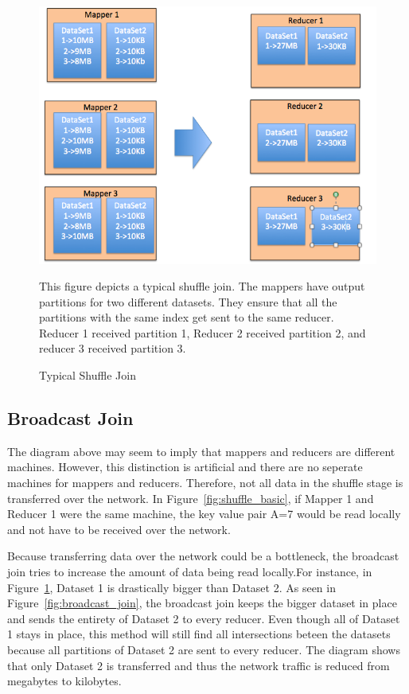 \begin{figure}[h]
\begin{center}
\includegraphics[scale=0.6]{./img/shuffle_join.png}
\caption{Typical Shuffle Join}
\label{fig:shuffle_join}
\end{center}
This figure depicts a typical shuffle join. The mappers have output partitions for two different datasets.
They ensure that all the partitions with the same index get sent to the same reducer. Reducer 1 received partition 1,
Reducer 2 received partition 2, and reducer 3 received partition 3.
\end{figure}

\subsection {Broadcast Join}
The diagram above  may seem to imply that mappers and reducers
are different machines. However, this distinction is artificial and there are no seperate machines for mappers and reducers. 
Therefore, not all data in the shuffle stage is transferred over the network. In Figure~\ref{fig:shuffle_basic}, if Mapper 1
and Reducer 1 were the same machine, the key value pair A=7 would be read locally and not have to be received over the network.

Because transferring data over the network could be a bottleneck, the broadcast join tries to increase the amount of data 
being read locally.For instance, in Figure~\ref{fig:shuffle_join}, Dataset 1 is drastically bigger than Dataset 2. As seen in Figure~\ref{fig:broadcast_join},
the broadcast join keeps the bigger dataset in place and sends the entirety of Dataset 2 to every reducer. Even though all of Dataset 1 stays in place, this method will still find all intersections beteen the datasets  because all partitions of Dataset 2 are sent to every reducer. The diagram shows that only Dataset 2 is transferred and thus the  network traffic is reduced from megabytes to kilobytes.

